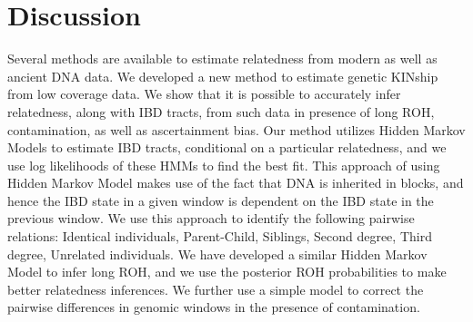 \documentclass[12pt, letterpaper]{article}
\begin{document}
\section{Discussion}

Several methods are available to estimate relatedness from modern as well as ancient DNA data. We developed a new method to estimate genetic KINship from low coverage data. We show that it is possible to accurately infer relatedness, along with IBD tracts, from such data in presence of long ROH, contamination, as well as ascertainment bias. Our method utilizes Hidden Markov Models to estimate IBD tracts, conditional on a particular relatedness, and we use log likelihoods of these HMMs to find the best fit. This approach of using Hidden Markov Model makes use of the fact that DNA is inherited in blocks, and hence the IBD state in a given window is dependent on the IBD state in the previous window. We use this approach to identify the following pairwise relations: Identical individuals, Parent-Child, Siblings, Second degree, Third degree, Unrelated individuals. We have developed a similar Hidden Markov Model to infer long ROH, and we use the posterior ROH probabilities to make better relatedness inferences. We further use a simple model to correct the pairwise differences in genomic windows in the presence of contamination. 
\end{document}
